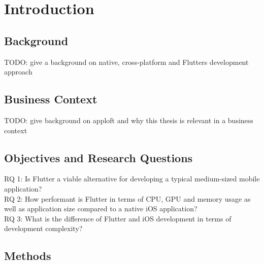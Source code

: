 
\chapter{Introduction}

\section{Background}
TODO: give a background on native, cross-platform and Flutters development approach


\section{Business Context}
TODO: give background on apploft and why this thesis is relevant in a business context

\section{Objectives and Research Questions}
RQ 1: Is Flutter a viable alternative for developing a typical medium-sized mobile application?\\
RQ 2: How performant is Flutter in terms of CPU, GPU and memory usage as well as application size compared to a native iOS application?\\
RQ 3: What is the difference of Flutter and iOS development in terms of development complexity?\\



\section{Methods}
